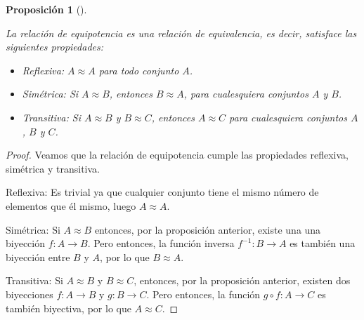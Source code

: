\documentclass[
  a4paper,
]{scrreport}
\providecommand{\tightlist}{%
  \setlength{\itemsep}{0pt}\setlength{\parskip}{0pt}}\usepackage{longtable,booktabs,array}
\theoremstyle{definition}
\theoremstyle{plain}
\theoremstyle{definition}
\theoremstyle{definition}
\theoremstyle{plain}
\theoremstyle{plain}
\newtheorem{proposition}{Proposición}[chapter]
\theoremstyle{remark}
\begin{document}
\begin{proposition}[]\protect\hypertarget{prp-equipotencia-relacion-equivalencia}{}\label{prp-equipotencia-relacion-equivalencia}

La relación de equipotencia es una relación de equivalencia, es decir,
satisface las siguientes propiedades:

\begin{itemize}
\tightlist
\item
  \emph{Reflexiva:} \(A\approx A\) para todo conjunto \(A\).
\item
  \emph{Simétrica:} Si \(A\approx B\), entonces \(B\approx A\), para
  cualesquiera conjuntos \(A\) y \(B\).
\item
  \emph{Transitiva:} Si \(A\approx B\) y \(B\approx C\), entonces
  \(A\approx C\) para cualesquiera conjuntos \(A\), \(B\) y \(C\).
\end{itemize}

\end{proposition}

\begin{tcolorbox}[enhanced jigsaw, leftrule=.75mm, colbacktitle=quarto-callout-note-color!10!white, toprule=.15mm, opacityback=0, opacitybacktitle=0.6, toptitle=1mm, breakable, bottomtitle=1mm, colframe=quarto-callout-note-color-frame, rightrule=.15mm, titlerule=0mm, title=\textcolor{quarto-callout-note-color}{\faInfo}\hspace{0.5em}{Demostración}, arc=.35mm, left=2mm, bottomrule=.15mm, colback=white, coltitle=black]

\begin{proof}
Veamos que la relación de equipotencia cumple las propiedades reflexiva,
simétrica y transitiva.

Reflexiva: Es trivial ya que cualquier conjunto tiene el mismo número de
elementos que él mismo, luego \(A\approx A\).

Simétrica: Si \(A\approx B\) entonces, por la proposición anterior,
existe una una biyección \(f:A\longrightarrow B\). Pero entonces, la
función inversa \(f^{-1}:B\longrightarrow A\) es también una biyección
entre \(B\) y \(A\), por lo que \(B\approx A\).

Transitiva: Si \(A\approx B\) y \(B\approx C\), entonces, por la
proposición anterior, existen dos biyecciones \(f:A\longrightarrow B\) y
\(g:B\longrightarrow C\). Pero entonces, la función
\(g\circ f:A\longrightarrow C\) es también biyectiva, por lo que
\(A\approx C\).
\end{proof}

\end{tcolorbox}
\end{document}

